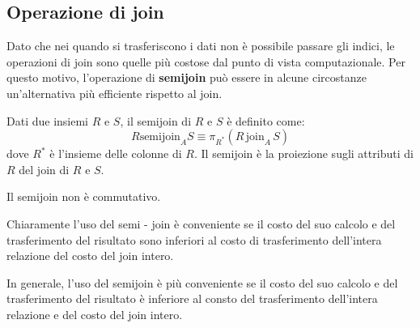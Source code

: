 \subsection{Operazione di join}
Dato che nei quando si trasferiscono i dati non è possibile passare gli indici,
le operazioni di join sono quelle più costose dal punto di vista computazionale.
Per questo motivo, l'operazione di \textbf{semijoin} può essere in alcune circostanze
un'alternativa più efficiente rispetto al join.
\begin{definizione}
    Dati due insiemi $R$ e $S$, il semijoin di $R$ e $S$ è definito come:
    \begin{equation*}
        R \text{semijoin}_A S \equiv \pi_{R^\ast}(R \, \text{join}_A \, S)
    \end{equation*}
    dove $R^\ast$ è l'insieme delle colonne di $R$. Il semijoin è la proiezione
    sugli attributi di $R$ del join di $R$ e $S$.
\end{definizione}
\begin{nota}
    Il semijoin non è commutativo.
\end{nota}
Chiaramente l'uso del semi - join è conveniente se il costo del suo calcolo e
del trasferimento del risultato sono inferiori al costo di trasferimento
dell'intera relazione del costo del join intero.

In generale, l'uso del semijoin è più conveniente se il costo del suo calcolo e
del trasferimento del risultato è inferiore al consto del trasferimento
dell'intera relazione e del costo del join intero.
